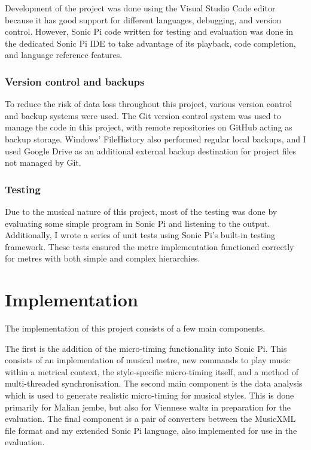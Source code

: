 \documentclass[12pt,twoside,openright]{report}
\begin{document}
Development of the project was done using the Visual Studio Code editor because
it has good support for different languages, debugging, and version control.
However, Sonic Pi code written for testing and evaluation was done in the
dedicated Sonic Pi IDE to take advantage of its playback, code completion, and
language reference features.


\subsection{Version control and backups}

To reduce the risk of data loss throughout this project, various version control
and backup systems were used. The Git version control system was used to manage
the code in this project, with remote repositories on GitHub acting as backup
storage. Windows' FileHistory also performed regular local backups, and I used
Google Drive as an additional external backup destination for project files not
managed by Git.


\subsection{Testing}

Due to the musical nature of this project, most of the testing was done by
evaluating some simple program in Sonic Pi and listening to the output.
Additionally, I wrote a series of unit tests using Sonic Pi's built-in testing
framework. These tests ensured the metre implementation functioned correctly for
metres with both simple and complex hierarchies.





\chapter{Implementation} \label{implementation}

The implementation of this project consists of a few main components.

The first is the addition of the micro-timing functionality into Sonic Pi.
This consists of an implementation of musical metre, new commands to play music
within a metrical context, the style-specific micro-timing itself, and a method
of multi-threaded synchronisation. The second main component is the data
analysis which is used to generate realistic micro-timing for musical styles.
This is done primarily for Malian jembe, but also for Viennese waltz in
preparation for the evaluation. The final component is a pair of converters
between the MusicXML file format and my extended Sonic Pi language, also
implemented for use in the evaluation.
\end{document}
